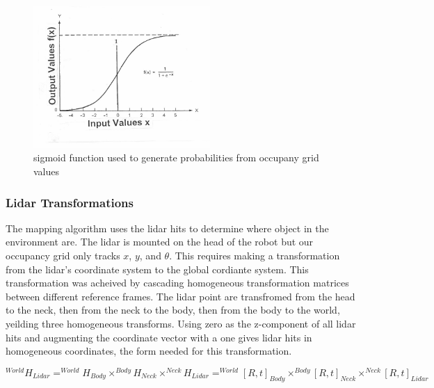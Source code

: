 \documentclass{article}
\begin{document}
\begin{figure}[!h]
\includegraphics[width = 0.6\textwidth]{sigmoid.jpg}
\centering
\caption{sigmoid function used to generate probabilities from occupany grid values}
\end{figure}

\FloatBarrier

\subsubsection{Lidar Transformations}
\par
The mapping algorithm uses the lidar hits to determine where object in the environment are. The lidar is mounted on the head of the robot but our occupancy grid only tracks $x$, $y$, and $\theta$. This requires making a transformation from the lidar's coordinate system to the global cordiante system. This transformation was acheived by cascading homogeneous transformation matrices between different reference frames. The lidar point are transfromed from the head to the neck, then from the neck to the body, then from the body to the world, yeilding three homogeneous transforms. Using zero as the z-component of all lidar hits and augmenting the coordinate vector with a one gives lidar hits in homogeneous coordinates, the form needed for this transformation.

$$ ^{World}H_{Lidar} = ^{World}H_{Body} \times ^{Body}H_{Neck} \times ^{Neck}H_{Lidar}  =  ^{World}[R,t]_{Body} \times ^{Body}[R,t]_{Neck} \times ^{Neck}[R,t]_{Lidar} $$
\end{document}
